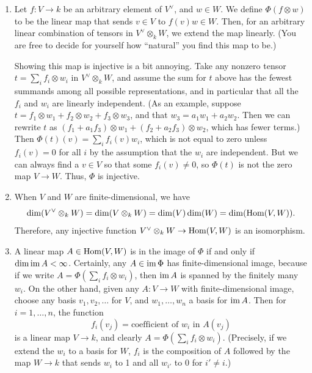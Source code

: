 \begin{solution}
\begin{enumerate}
    \item Let $f \colon V \to k$ be an arbitrary element of $V^\vee$, and $w \in W$. We define $\Phi(f\otimes w)$ to be the linear map that sends $v \in V$ to $f(v)w \in W$. Then, for an arbitrary linear combination of tensors in $V^\vee \otimes_k W$, we extend the map linearly. (You are free to decide for yourself how ``natural'' you find this map to be.)

    Showing this map is injective is a bit annoying. Take any nonzero tensor $t = \sum_i f_i \otimes w_i$ in $V^\vee \otimes_k W$, and assume the sum for $t$ above has the fewest summands among all possible representations, and in particular that all the $f_i$ and $w_i$ are linearly independent. (As an example, suppose $t = f_1 \otimes w_1 + f_2 \otimes w_2 + f_3 \otimes w_3$, and that $w_3 = a_1 w_1 + a_2 w_2$. Then we can rewrite $t$ as $(f_1 + a_1 f_3)\otimes w_1 + (f_2 + a_2 f_3) \otimes w_2$, which has fewer terms.) Then $\Phi(t)(v) = \sum_i f_i(v) w_i$, which is not equal to zero unless $f_i(v) = 0$ for all $i$ by the assumption that the $w_i$ are independent. But we can always find a $v\in V$ so that some $f_i(v) \neq 0$, so $\Phi(t)$ is not the zero map $V \to W$. Thus, $\Phi$ is injective.
    \item When $V$ and $W$ are finite-dimensional, we have
    \[\dim(V^\vee \otimes_k W) = \dim(V \otimes_k W) = \dim(V) \dim(W) = \dim(\operatorname{Hom}(V,W)).\]
    Therefore, any injective function $V^\vee \otimes_k W \to \operatorname{Hom}(V,W)$ is an isomorphism.
    \item A linear map $A \in \operatorname{Hom}(V,W)$ is in the image of $\Phi$ if and only if $\dim \operatorname{im} A < \infty$. Certainly, any $A \in \operatorname{im} \Phi$ has finite-dimensional image, because if we write $A = \Phi\left(\sum_i f_i \otimes w_i\right)$, then $\operatorname{im} A$ is spanned by the finitely many $w_i$. On the other hand, given any $A \colon V \to W$ with finite-dimensional image, choose any basis $v_1,v_2,\dots$ for $V$, and $w_1,\dots,w_n$ a basis for $\operatorname{im} A$. Then for $i=1,\dots,n$, the function
    \[f_i(v_j) = \text{coefficient of }w_i\text{ in } A(v_j)\]
    is a linear map $V \to k$, and clearly $A = \Phi\left(\sum_i f_i \otimes w_i\right)$. (Precisely, if we extend the $w_i$ to a basis for $W$, $f_i$ is the composition of $A$ followed by the map $W \to k$ that sends $w_i$ to 1 and all $w_{i'}$ to 0 for $i' \neq i$.)
\end{enumerate}
\end{solution}

